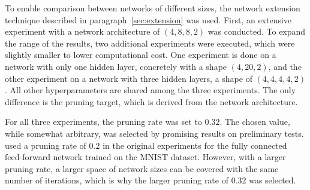 To enable comparison between networks of different sizes, the network extension technique described in paragraph~\ref{sec:extension} was used.
First, an extensive experiment with a network architecture of $(4,8,8,2)$ was conducted.
To expand the range of the results, two additional experiments were executed, which were slightly smaller to lower computational cost.
One experiment is done on a network with only one hidden layer, concretely with a shape $(4,20,2)$, and the other experiment on a network with three hidden layers, a shape of $(4,4,4,4,2)$.
All other hyperparameters are shared among the three experiments.
The only difference is the pruning target, which is derived from the network architecture.

For all three experiments, the pruning rate was set to $0.32$.
The chosen value, while somewhat arbitrary, was selected by promising results on preliminary tests.
\textcite{LTH} used a pruning rate of $0.2$ in the original experiments for the fully connected feed-forward network trained on the MNIST dataset.
However, with a larger pruning rate, a larger space of network sizes can be covered with the same number of iterations, which is why the larger pruning rate of $0.32$ was selected.

